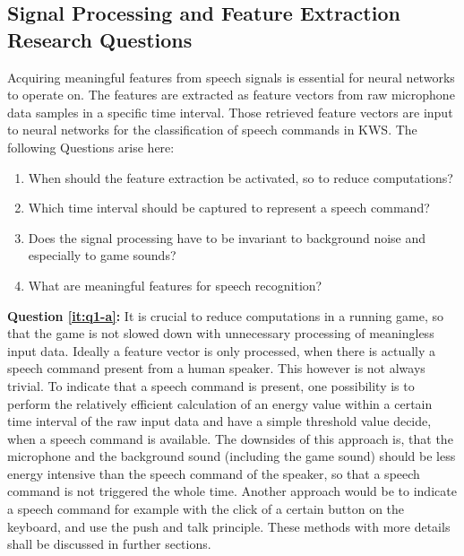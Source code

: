 \subsection{Signal Processing and Feature Extraction Research Questions}\label{sec:intro_rq_signal}
Acquiring meaningful features from speech signals is essential for neural networks to operate on. 
The features are extracted as feature vectors from raw microphone data samples in a specific time interval. 
Those retrieved feature vectors are input to neural networks for the classification of speech commands in KWS. 
The following Questions arise here:
\begin{enumerate}[label={Q.1.\alph*)}, leftmargin=1.75cm]
    \item When should the feature extraction be activated, so to reduce computations?
    \label{it:q1-a}
    \item Which time interval should be captured to represent a speech command?
    \label{it:q1-b}
    \item Does the signal processing have to be invariant to background noise and especially to game sounds?
    \label{it:q1-c}
    \item What are meaningful features for speech recognition?
    \label{it:q1-d}
\end{enumerate}
\noindent
\textbf{Question \ref{it:q1-a}:} 
It is crucial to reduce computations in a running game, so that the game is not slowed down with unnecessary processing of meaningless input data.
Ideally a feature vector is only processed, when there is actually a speech command present from a human speaker. 
This however is not always trivial.
To indicate that a speech command is present, one possibility is to perform the relatively efficient calculation of an energy value within a certain time interval of the raw input data and have a simple threshold value decide, when a speech command is available. 
The downsides of this approach is, that the microphone and the background sound (including the game sound) should be less energy intensive than the speech command of the speaker, so that a speech command is not triggered the whole time.
Another approach would be to indicate a speech command for example with the click of a certain button on the keyboard, and use the push and talk principle. 
These methods with more details shall be discussed in further sections.

